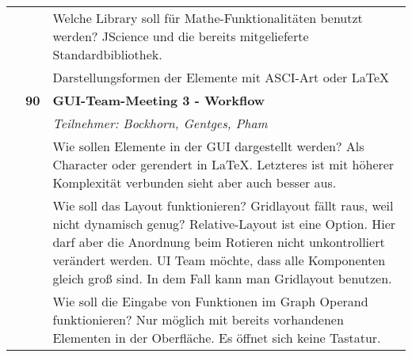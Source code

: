 {{\begin{longtable}{|l|l|p{11cm}|}
			\\ & &
			Welche Library soll für Mathe-Funktionalitäten benutzt werden? JScience und die bereits mitgelieferte Standardbibliothek.
			\\ & &
			Darstellungsformen der Elemente mit ASCI-Art oder LaTeX
		\\ \cline{2-3}
		& \textbf{\hfill90} & \textbf{GUI-Team-Meeting 3 - Workflow} 
			\\ & &
			\small{\textit{Teilnehmer: Bockhorn, Gentges, Pham}}
			\\ & &
			Wie sollen Elemente in der GUI dargestellt werden? Als Character oder gerendert in LaTeX. Letzteres ist mit höherer Komplexität verbunden sieht aber auch besser aus. 
			\\ & &
			Wie soll das Layout funktionieren? Gridlayout fällt raus, weil nicht dynamisch genug? Relative-Layout ist eine Option. Hier darf aber die Anordnung beim Rotieren nicht unkontrolliert verändert werden. UI Team möchte, dass alle Komponenten gleich groß sind. In dem Fall kann man Gridlayout benutzen.
			\\ & &
			Wie soll die Eingabe von Funktionen im Graph Operand funktionieren? Nur möglich mit bereits vorhandenen Elementen in der Oberfläche. Es öffnet sich keine Tastatur.
	

\end{longtable}}}

